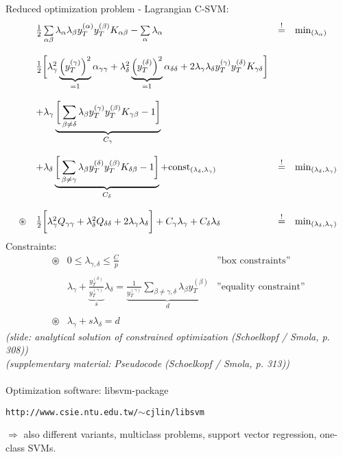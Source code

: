 Reduced optimization problem - Lagrangian C-SVM:
\begin{equation}
	\begin{array}{llll}
	& \frac{1}{2} \sum\limits_{\alpha \beta} \lambda_\alpha \lambda_\beta
		y_T^{(\alpha)} y_T^{(\beta)} K_{\alpha \beta} 
		- \sum\limits_\alpha \lambda_\alpha
	& \stackrel{\mathrm{!}}{=} & \min_{(\lambda_\alpha)} \\\\
	& \frac{1}{2} \bigg[ \lambda_\gamma^2 
		\underbrace{ \Big( y_T^{(\gamma)} \Big)^2 }_{= 1} 
		\alpha_{\gamma\gamma} + \lambda_\delta^2 
		\underbrace{ \Big( y_T^{(\delta)} \Big)^2 }_{= 1}
		\alpha_{\delta\delta} + 2 \lambda_\gamma \lambda_\delta
		y_T^{(\gamma)} y_T^{(\delta)} K_{\gamma\delta}
		\bigg]
	& & \\\\
		& + \lambda_\gamma \underbrace{ \bigg[
		\sum\limits_{\beta \neq \delta} \lambda_\beta 
		y_T^{(\gamma)} y_T^{(\beta)} K_{\gamma\beta} - 1
		\bigg] }_{C_\gamma}
	& & \\\\
		& + \lambda_\delta \underbrace{ \bigg[ 
		\sum\limits_{\beta \neq \gamma} \lambda_\beta 
		y_T^{(\delta)} y_T^{(\beta)} K_{\delta\beta} - 1
		\bigg] }_{C_\delta}
		+ \mathrm{const}_{(\lambda_\delta, \lambda_\gamma)}
	& \stackrel{\mathrm{!}}{=} & \min_{(\lambda_\delta, \lambda_\gamma)} \\\\
	\circledast & \frac{1}{2} \bigg[ \lambda_\gamma^2 
		Q_{\gamma\gamma} + \lambda_\delta^2 Q_{\delta\delta}
		+ 2 \lambda_\gamma \lambda_\delta
		\bigg] + C_\gamma \lambda_\gamma + C_\delta \lambda_\delta
	& \stackrel{\mathrm{!}}{=} & \min_{(\lambda_\delta, \lambda_\gamma)}
	\end{array}
\end{equation}
Constraints:
\begin{equation}
	\begin{array}{lll}
	\circledast & 0 \leq \lambda_{\gamma,\delta} \leq \frac{C}{p}
		& \text{''box constraints''} \\\\
	& \lambda_\gamma + \underbrace{ \frac{y_T^{(\delta)}}{
			y_T^{(\gamma)}}}_{s} \lambda_\delta 
		= \underbrace{ \frac{1}{y_T^{(\gamma)}} 
			\sum\limits_{\beta \neq \gamma, \delta} \lambda_\beta
			y_T^{(\beta)} }_{d}
		& \text{''equality constraint''} \\\\
	\circledast & \lambda_\gamma + s \lambda_\delta = d
	\end{array}
\end{equation}
{\it (slide: analytical solution of constrained optimization (Schoelkopf / Smola, p. 308))} \\
{\it (supplementary material: Pseudocode (Schoelkopf / Smola, p. 313))}
\\\\
Optimization software: libsvm-package
\begin{center}
\verb|http://www.csie.ntu.edu.tw/|$\sim$\verb|cjlin/libsvm|
\end{center}
$\Rightarrow$ also different variants, multiclass problems, support vector regression, one-class SVMs. 

